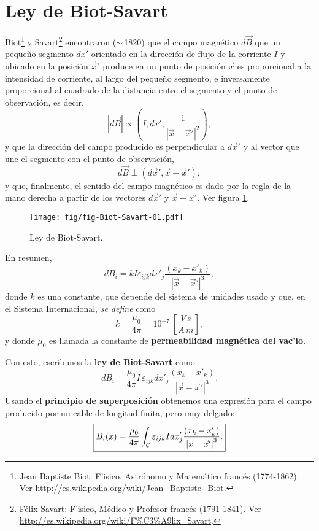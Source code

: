 \section{Ley de Biot-Savart}
Biot\footnote{Jean Baptiste Biot: F'isico, Astrónomo y Matemático francés (1774-1862). Ver \url{http://es.wikipedia.org/wiki/Jean_Baptiste_Biot}.} y Savart\footnote{Félix Savart: F'isico, Médico y Profesor francés (1791-1841). Ver \url{http://es.wikipedia.org/wiki/F\%C3\%A9lix_Savart}.} encontraron ($\sim$\,1820) que el campo magnético $d\vec{B}$ que un peque\~no segmento $dx'$ orientado en la dirección de flujo de la corriente $I$ y ubicado en la posición $\vec{x}'$ produce en un punto de posición $\vec{x}$ es proporcional a la intensidad de corriente, al largo del
peque\~no segmento, e inversamente proporcional al cuadrado de la distancia
entre el segmento y el punto de observación, es decir,
\begin{equation}
 \left\vert d\vec{B}\right\vert \propto
\left(I,dx',\frac{1}{\left|\vec{x}-\vec{x}'\right|^2}\right),
\end{equation}
y que la dirección del campo producido es perpendicular a $d\vec{x}'$ y al
vector que une el segmento con el punto de observación,
\begin{equation}
d\vec{B}  \perp\left(  d\vec{x}', \vec{x}-\vec{x}' \right) ,
\end{equation}
y que, finalmente, el sentido del campo magnético es dado por la regla de la mano derecha a partir de los vectores $d\vec{x}'$ y $\vec{x}-\vec{x}'$. Ver figura \ref{fBS1}. 
\begin{figure}[!h]
\centerline{\texttt{[image: fig/fig-Biot-Savart-01.pdf]}}
\label{Esquema para la ley de Biot-Savart.}
\label{fBS1}
\caption{Ley de Biot-Savart.}
\end{figure}
En resumen,
\begin{equation}
dB_i=kI\varepsilon_{ijk}dx'_j\frac{\left(x_k-x'_k\right)}{\left\vert
\vec{x}-\vec{x}'\right\vert^3},
\end{equation}
donde $k$ es una constante, que depende del sistema de unidades usado y que,
en el Sistema Internacional, \textit{se define} como
\begin{equation}
k=\frac{\mu_0}{4\pi}=10^{-7}~\left[  \frac{V\,s}{A\,m}\right],
\end{equation}
y donde $\mu_0$ es llamada la constante de \textbf{permeabilidad magnética del vac'io}.

Con esto, escribimos la \textbf{ley de Biot-Savart} como
\begin{equation}
dB_i=\frac{\mu_0}{4\pi}I\,\varepsilon_{ijk}dx'_j\frac{\left(x_k-x'_k\right)}
{\left\vert \vec{x}-\vec{x}'\right\vert ^3}.
\end{equation}
Usando el \textbf{principio de superposición} obtenemos una expresión para el campo producido por un cable de longitud finita, pero muy delgado:
\begin{equation}
\boxed{B_i(x)=\frac{\mu_0}{4\pi}\int_{\cal C}\varepsilon_{ijk}Idx'_j
\frac{\left(x_k-x'_k\right)}{\left\vert\vec{x}-\vec{x}'\right\vert^3}.}
\label{BS1}
\end{equation}

